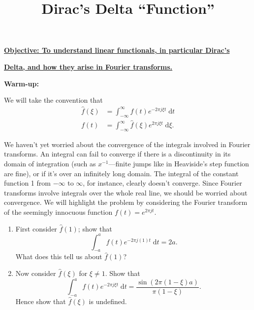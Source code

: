 \documentclass{article}
\newcommand{\diff}{\;\mathrm{d}}
\begin{document}
\title{Dirac's Delta ``Function''}
\date{}

\maketitle
\thispagestyle{empty}

\Large



\textbf{\underline{Objective: To understand linear functionals, in particular Dirac's}}

\textbf{\underline{Delta, and how they arise in Fourier transforms.}}






\vspace{5mm}












\textbf{Warm-up:}

\bigskip


We will take the convention that
\begin{align*}
	\hat{f}(\xi)&=\int_{-\infty}^\infty f(t)e^{-2\pi j\xi t}\diff t\\
	f(t)&=\int_{-\infty}^\infty \hat{f}(\xi)e^{2\pi j\xi t}\diff \xi.
\end{align*}\bigskip


We haven't yet worried about the convergence of the integrals involved in Fourier transforms. An integral can fail to converge if there is a discontinuity in its domain of integration (such as $x^{-1}$---finite jumps like in Heaviside's step function are fine), or if it's over an infinitely long domain. The integral of the constant function 1 from $-\infty$ to $\infty$, for instance, clearly doesn't converge. Since Fourier transforms involve integrals over the whole real line, we should be worried about convergence. We will highlight the problem by considering the Fourier transform of the seemingly innocuous function $f(t)=e^{2\pi jt}$.

\begin{enumerate}
	\item First consider $\hat{f}(1)$; show that
		\[\int_{-a}^a f(t)e^{-2\pi j(1) t}\diff t = 2a.\]
		What does this tell us about $\hat{f}(1)$?
	\item Now consider $\hat{f}(\xi)$ for $\xi\neq 1$. Show that
		\[\int_{-a}^a f(t)e^{-2\pi j\xi t}\diff t = \frac{\sin(2\pi (1-\xi)a)}{\pi(1-\xi)}.\]
		Hence show that $\hat{f}(\xi)$ is undefined.
\end{enumerate}
\end{document}

